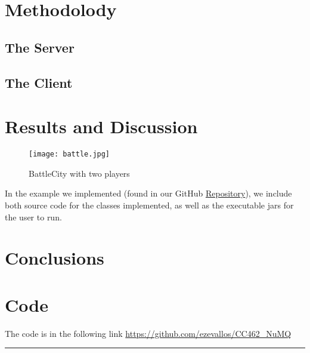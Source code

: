 \documentclass[10pt,a4paper]{article}
\theoremstyle{definition}
\begin{document}
\section{Methodolody}
\subsection{The Server}
\subsection{The Client}
\section{Results and Discussion}

\begin{figure}[H]
	\centering
	\texttt{[image: battle.jpg]}
	\caption{BattleCity with two players}
	\label{fig:battlecity}
\end{figure}

In the example we implemented (found in our GitHub \href{https://github.com/ezevallos/CC462_NuMQ}{Repository}), we include both source code for the classes implemented, as well as the executable jars for the user to run.

\section{Conclusions}

\section{Code}
The code is in the following link \url{https://github.com/ezevallos/CC462_NuMQ}



\vspace{20pt}
\hrule
\vspace{10pt}

\nocite{*}
%



\end{document}
